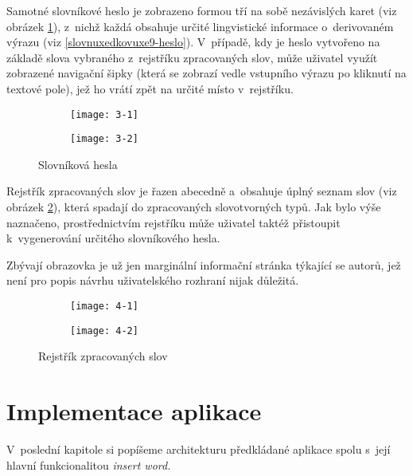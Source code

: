 Samotné slovníkové heslo je zobrazeno formou tří na sobě nezávislých
karet (viz obrázek \ref{3}), z~nichž každá obsahuje určité lingvistické
informace o~derivovaném výrazu (viz \ref{slovnuxedkovuxe9-heslo}).
V~případě, kdy je heslo vytvořeno na základě slova vybraného z~rejstříku
zpracovaných slov, může uživatel využít zobrazené navigační šipky (která
se zobrazí vedle vstupního výrazu po kliknutí na textové pole), jež ho
vrátí zpět na určité místo v~rejstříku.

\begin{figure}[ht]
  \begin{subfigure}[b]{0.45\textwidth}
    \texttt{[image: 3-1]}
  \end{subfigure}
  \hfill
  \begin{subfigure}[b]{0.45\textwidth}
    \texttt{[image: 3-2]}
  \end{subfigure}
  \caption{Slovníková hesla}
  \label{3}
\end{figure}

Rejstřík zpracovaných slov je řazen abecedně a~obsahuje úplný seznam
slov (viz obrázek \ref{4}), která spadají do zpracovaných slovotvorných
typů. Jak bylo výše naznačeno, prostřednictvím rejstříku může uživatel
taktéž přistoupit k~vygenerování určitého slovníkového hesla.

Zbývají obrazovka je už jen marginální informační stránka týkající se
autorů, jež není pro popis návrhu uživatelského rozhraní nijak důležitá.

\begin{figure}[ht]
  \begin{subfigure}[b]{0.45\textwidth}
    \texttt{[image: 4-1]}
  \end{subfigure}
  \hfill
  \begin{subfigure}[b]{0.45\textwidth}
    \texttt{[image: 4-2]}
  \end{subfigure}
  \caption{Rejstřík zpracovaných slov}
  \label{4}
\end{figure}

\hypertarget{implementace-aplikace}{%
\section{Implementace aplikace}\label{implementace-aplikace}}

V~poslední kapitole si popíšeme architekturu předkládané aplikace spolu
s~její hlavní funkcionalitou \emph{insert word.}

